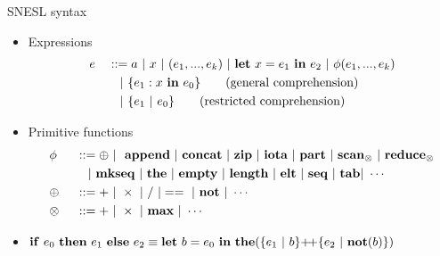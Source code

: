 \documentclass{beamer}
\begin{document}
\begin{frame}{SNESL syntax} \small
	\begin{itemize}
		\item<1-> Expressions
		\begin{alignat*}{2}
		& e &&::=  a \ | \ x \ | \ (e_1,...,e_k) \ | \ \Let{x}{e_1}{e_2} \ | \ \hcall{\Tupk{e}} \\ 
		&   && \quad | \ \{e_1:  x \ \*{in} \ e_0 \} \tag{general comprehension} \\
		&   && \quad | \ \{e_1 \ | \ e_0 \}\tag {restricted comprehension} 
		\end{alignat*}	
  \item<2-> Primitive functions
		\begin{alignat*}{2} 
		&\hcall && ::= \oplus \ | \ \ \*{append} \ | \ \*{concat} \ | \ \*{zip} \ | \ \*{iota}  \ | \ \*{part}  \ | \ \*{scan}_{\otimes} \ | \ \*{reduce}_{\otimes} \\ 
		&   && \quad | \ \*{mkseq} \ |  \ \*{the}  \ | \ \*{empty} \ | \ \*{length} \ | \ \*{elt}  \ | \ \*{seq} \ | \ \*{tab} | \ \cdots \\
		& \oplus  \ && :: = +  \ | \ \times \ |  \  / \ | ==  \ | \ \*{not} \ | \ \cdots  \\
		& \otimes \ && :: = + \ | \ \times  \ | \ \*{max} \ | \ \cdots 
		\end{alignat*} 
\item<3-> $\*{if} \ e_0 \ \*{then} \ e_1 \ \*{else} \ e_2 \equiv \Let{b}{e_0}{ \*{the}(\{e_1 \ | \ b \} {\++} \{e_2 \ | \ \*{not}(b)\})} $

	\end{itemize}
\end{frame}
\end{document}
